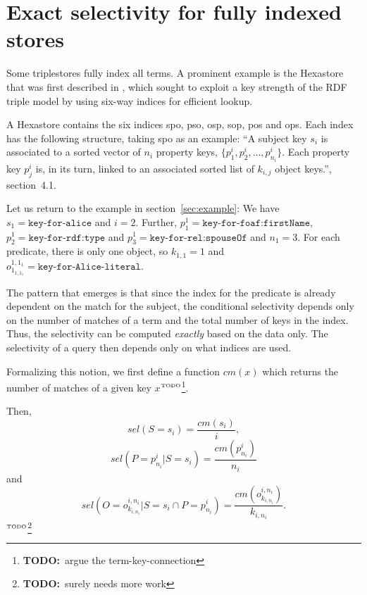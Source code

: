\documentclass[12pt, draft]{article}
\newcommand{\rdfterm}[1]{\texttt{#1}}
\newcommand{\todo}[1]{\ensuremath{^{\textrm{\tiny{TODO}\normalsize}}}\footnote{\textbf{TODO:}~#1}}
\newcommand{\sel}[1]{\ensuremath{sel\left(#1\right)}}
\begin{document}



\section{Exact selectivity for fully indexed stores}

Some triplestores fully index all terms. A prominent example is the
Hexastore that was first described in
\cite{Weiss:2008:HSI:1453856.1453965}, which sought to exploit a key
strength of the RDF triple model by using six-way indices for
efficient lookup.

A Hexastore contains the six indices \textsf{spo}, \textsf{pso},
\textsf{osp}, \textsf{sop}, \textsf{pos} and \textsf{ops}. Each index
has the following structure, taking \textsf{spo} as an example: ``A
subject key $s_i$ is associated to a sorted vector of $n_i$ property
keys, $\{p_1^i , p_2^i , \ldots , p^i_{n_i} \}$. Each property key $p_j^i$
is, in its turn, linked to an associated sorted list of $k_{i,j}$
object keys.''\cite{Weiss:2008:HSI:1453856.1453965}, section~4.1.

Let us return to the example in section~\ref{sec:example}: We have
$s_1 = \texttt{key-for-alice}$ and $i=2$. Further, $p_1^1 =
\texttt{key-for-foaf:firstName}$, $p_2^1 = \texttt{key-for-rdf:type}$ and $p_3^1 =
\texttt{key-for-rel:spouseOf}$ and $n_1 = 3$. For each predicate, there is only
one object, so $k_{1,1} = 1$ and $o_{1_{1,1_1}}^{1,1_1} = \texttt{key-for-Alice-literal}$.

The pattern that emerges is that since the index for the predicate is
already dependent on the match for the subject, the conditional
selectivity depends only on the number of matches of a term and the
total number of keys in the index. Thus, the selectivity can be
computed \emph{exactly} based on the data only. The selectivity of a
query then depends only on what indices are used. 

Formalizing this notion, we first define a function $cm(x)$ which
returns the number of matches of a given key $x$\todo{argue the
  term-key-connection}. 

Then, 
\begin{equation}
\sel{S = s_i} = \frac{cm(s_i)}{i} ,
\end{equation}
\begin{equation}
\sel{P = p_{n_i}^i|S = s_i} = \frac{cm(p_{n_i}^i)}{n_i}
\end{equation}
and
\begin{equation}
\sel{O = o_{k_{i,n_i}}^{i,n_i} |S = s_i \cap P = p_{n_i}^i} =
\frac{cm(o_{k_{i,n_i}}^{i,n_i})}{k_{i,n_i}} .
\end{equation}
\todo{surely needs more work}
\end{document}
